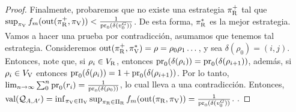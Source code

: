 \begin{proof}
Finalmente, probaremos que no existe una estrategia $\pi^+_{\mathrm{R}}$  tal que $\sup_{\pi_{\mathrm{V}}} f_{m}(\operatorname{out}(\pi^+_{\mathrm{R}}, \pi_{\mathrm{V}})) < \frac{1}{\operatorname{pr}_{0}(\delta(v^G_0))}$. 
De esta forma, $\pi^*_{\mathrm{R}}$ es la mejor estrategia. 
Vamos a hacer una prueba por contradicción, asumamos que tenemos tal estrategia. Consideremos $\operatorname{out}(\pi^+_{\mathrm{R}}, \pi^*_{\mathrm{V}}) = \rho = \rho_0 \rho_1 \dots$, 
y sea $\delta(\rho_0) = (i,j)$. Entonces, note que, si $\rho_i \in V_{\mathrm{R}}$, entonces $\operatorname{pr}_{0}(\delta(\rho_i)) = \operatorname{pr}_{0}(\delta(\rho_{i+1}))$, 
además, si $\rho_i \in V_{\mathrm{V}}$ entonces $\operatorname{pr}_{0}(\delta(\rho_i)) = 1 + \operatorname{pr}_{0}(\delta(\rho_{i+1}))$. 
Por lo tanto, $\lim_{n \rightarrow \infty}\sum^n_{0} \operatorname{pr}_{0}(r_i) = \frac{1}{\operatorname{pr}_{0}(\delta(\rho_0))}$, lo cual lleva a una contradicción.
Entonces, $\operatorname{val}(\mathcal{Q}_{A, A'}) = \inf_{\pi_{\mathrm{V}} \in \Pi_{\mathrm{V}}} \sup_{\pi_{\mathrm{R}} \in \Pi_{\mathrm{R}}} f_{m}(\operatorname{out}(\pi_{\mathrm{R}}, \pi_{\mathrm{V}})) = \frac{1}{\operatorname{pr}_{0}(\delta(v^G_0))}$.
\qedhere
.

\end{proof} \\


